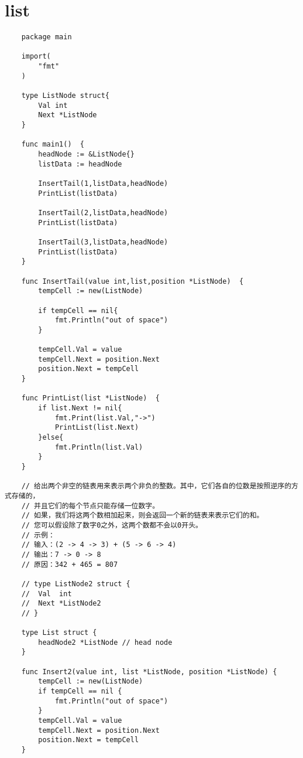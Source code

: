 \documentclass[oneside,12pt,twiside,a4paper]{ctexbook}
\begin{document}
\section{list}
\begin{lstlisting}
    package main

    import(
        "fmt"
    )
    
    type ListNode struct{
        Val int 
        Next *ListNode
    }
    
    func main1()  {
        headNode := &ListNode{}
        listData := headNode
    
        InsertTail(1,listData,headNode)
        PrintList(listData)
    
        InsertTail(2,listData,headNode)
        PrintList(listData)
    
        InsertTail(3,listData,headNode)
        PrintList(listData)
    }
    
    func InsertTail(value int,list,position *ListNode)  {
        tempCell := new(ListNode)
    
        if tempCell == nil{
            fmt.Println("out of space")
        }
    
        tempCell.Val = value
        tempCell.Next = position.Next
        position.Next = tempCell
    }
    
    func PrintList(list *ListNode)  {
        if list.Next != nil{
            fmt.Print(list.Val,"->")
            PrintList(list.Next)
        }else{
            fmt.Println(list.Val)
        }
    }
    
    // 给出两个非空的链表用来表示两个非负的整数。其中，它们各自的位数是按照逆序的方式存储的，
    // 并且它们的每个节点只能存储一位数字。
    // 如果，我们将这两个数相加起来，则会返回一个新的链表来表示它们的和。
    // 您可以假设除了数字0之外，这两个数都不会以0开头。
    // 示例：
    // 输入：(2 -> 4 -> 3) + (5 -> 6 -> 4)
    // 输出：7 -> 0 -> 8
    // 原因：342 + 465 = 807
    
    // type ListNode2 struct {
    // 	Val  int
    // 	Next *ListNode2
    // }
    
    type List struct {
        headNode2 *ListNode // head node
    }
    
    func Insert2(value int, list *ListNode, position *ListNode) {
        tempCell := new(ListNode)
        if tempCell == nil {
            fmt.Println("out of space")
        }
        tempCell.Val = value
        tempCell.Next = position.Next
        position.Next = tempCell
    }
    

\end{lstlisting}
\end{document}
